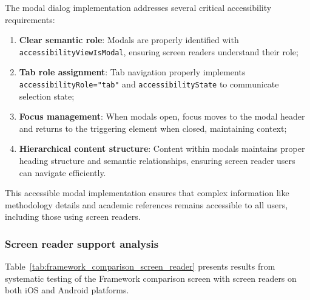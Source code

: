 The modal dialog implementation addresses several critical accessibility requirements:

\begin{enumerate}
    \item \textbf{Clear semantic role}: Modals are properly identified with \texttt{accessibilityViewIsModal}, ensuring screen readers understand their role;
    
    \item \textbf{Tab role assignment}: Tab navigation properly implements \texttt{accessibilityRole="tab"} and \texttt{accessibilityState} to communicate selection state;
    
    \item \textbf{Focus management}: When modals open, focus moves to the modal header and returns to the triggering element when closed, maintaining context;
    
    \item \textbf{Hierarchical content structure}: Content within modals maintains proper heading structure and semantic relationships, ensuring screen reader users can navigate efficiently.
\end{enumerate}

This accessible modal implementation ensures that complex information like methodology details and academic references remains accessible to all users, including those using screen readers.

\subsubsection{Screen reader support analysis}

Table~\ref{tab:framework_comparison_screen_reader} presents results from systematic testing of the Framework comparison screen with screen readers on both iOS and Android platforms.

